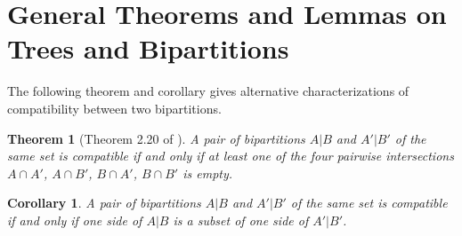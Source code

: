 \documentclass{bmcart}
\theoremstyle{mystyle}
\newtheorem{theorem}{Theorem}
\newtheorem{corollary}{Corollary}
\theoremstyle{proofstyle}
\begin{document}
\begin{backmatter}


\end{backmatter}

\newpage
\appendix

\section{General Theorems and Lemmas on Trees and Bipartitions}
The following theorem and corollary gives alternative characterizations of compatibility between two bipartitions. 
\begin{theorem}[Theorem 2.20 of \cite{warnow2017computational}]\label{thm:compatibility}
    A pair of bipartitions $A|B$ and $A'|B'$ of the same set is compatible if and only if at least one of the four pairwise intersections $A \cap A'$, $A\cap B'$, $B\cap A'$, $B \cap B'$ is empty. 
\end{theorem}

\begin{corollary}\label{cor:compatibility}
     A pair of bipartitions $A|B$ and $A'|B'$ of the same set is compatible if and only if one side of $A|B$ is a subset of one side of $A'|B'$.
\end{corollary}
\end{document}
